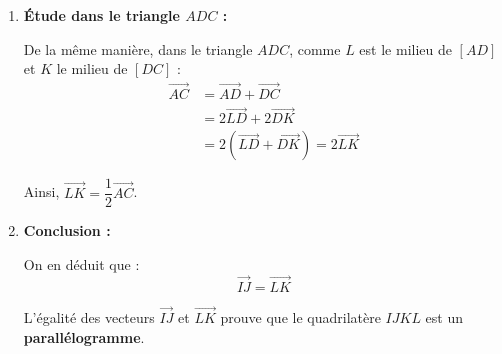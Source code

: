 \begin{exercice}
\begin{demo}
\begin{enumerate}
				Ainsi, $\vec{IJ} = \dfrac{1}{2}\times\vec{AC}$.

			\item \textbf{Étude dans le triangle $ADC$ :}

				De la même manière, dans le triangle $ADC$, comme $L$ est le milieu de $[AD]$ et $K$ le milieu de $[DC]$ :
				\begin{align*}
					\vec{AC} & = \vec{AD} + \vec{DC}                \\
					& = 2\vec{LD} + 2\vec{DK}              \\
					& = 2(\vec{LD} + \vec{DK}) = 2\vec{LK}
				\end{align*}

				Ainsi, $\vec{LK} = \dfrac{1}{2}\vec{AC}$.

			\item \textbf{Conclusion :}

				On en déduit que :
				\[
					\vec{IJ} = \vec{LK}
				\]

				L'égalité des vecteurs $\vec{IJ}$ et $\vec{LK}$ prouve que le quadrilatère $IJKL$ est un \textbf{parallélogramme}.
		\end{enumerate}
	\end{demo}
\end{exercice}
